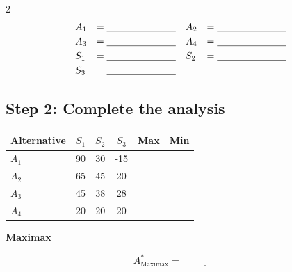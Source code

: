 \begin{multicols}{2}
		\[
		\begin{array}{llll}
			A_1 &= \underline{\hspace{2.5cm}} &
			A_2 &= \underline{\hspace{2.5cm}} \\[3pt]
			A_3 &= \underline{\hspace{2.5cm}} &
			A_4 &= \underline{\hspace{2.5cm}} \\[3pt]
			S_1 &= \underline{\hspace{2.5cm}} &
			S_2 &= \underline{\hspace{2.5cm}} \\[3pt]
			S_3 &= \underline{\hspace{2.5cm}} &
			&
		\end{array}
		\]
		
		\subsection*{Step 2: Complete the analysis}
		
		\begin{center}
			\renewcommand{\arraystretch}{1.5}
			\small
			\begin{tabular}{lccccc}
				\toprule
				Alternative & $S_1$ & $S_2$ & $S_3$ & Max & Min \\
				\midrule
				$A_1$ & 90 & 30 & -15 &
				\underline{\hspace{1.1cm}} &
				\underline{\hspace{1.1cm}}\\[3pt]
				$A_2$ & 65 & 45 & 20 &
				\underline{\hspace{1.1cm}} &
				\underline{\hspace{1.1cm}}\\[3pt]
				$A_3$ & 45 & 38 & 28 &
				\underline{\hspace{1.1cm}} &
				\underline{\hspace{1.1cm}}\\[3pt]
				$A_4$ & 20 & 20 & 20 &
				\underline{\hspace{1.1cm}} &
				\underline{\hspace{1.1cm}}\\
				\bottomrule
			\end{tabular}
		\end{center}
		
		\textbf{Maximax}

		\[
		A^*_{\mathrm{Maximax}}
		=\underline{\hspace{2cm}}
		\]
		

\end{multicols}
